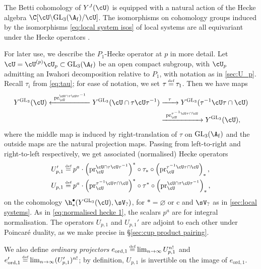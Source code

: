 \documentclass[10pt,reqno,a4paper]{amsart}
\newcommand{\subf}{_{\mathrm{f}}}
\newcommand{\GL}{\mathrm{GL}}
\begin{document}
The Betti cohomology of $Y^J(\cU)$ is equipped with a natural action of the Hecke algebra $\C[\cU \backslash \GL_3(\A\subf) / \cU]$. The isomorphisms on cohomology groups induced by the isomorphisms \eqref{eq:local system isos} of local systems are all equivariant under the Hecke operators \cite[\S1.2]{Urb11}.




\label{sec:hecke}

For later use, we describe the $P_1$-Hecke operator at $p$ in more detail. Let $\cU = \cU^{(p)}\cU_p \subset \GL_3(\A\subf)$ be an open compact subgroup, with $\cU_p$ admitting an Iwahori decomposition relative to $P_1$, with notation as in \cref{sec:U_p}.  Recall $\tau_i$ from \eqref{eq:tau}; for ease of notation, we set $\tau \defeq \tau_1$. Then we have maps
\begin{align*}
Y^{\GL_3}(\cU)\xleftarrow{\ \mathrm{pr}_{\cU}^{\cU \cap \tau \cU\tau^{-1}}\ }	Y^{\GL_3}(\cU \cap \tau \cU\tau^{-1})
&\xrightarrow{\ \ \tau\ \ }
Y^{\GL_3}(\tau^{-1} \cU \tau \cap \cU)\\
&\xrightarrow{\ \mathrm{pr}_{\cU}^{\tau^{-1} \cU \tau \cap \cU}\ } Y^{\GL_3}(\cU),
\end{align*}
where the middle map is induced by right-translation of $\tau$ on $\GL_3(\A\subf)$ and the outside maps are the natural projection maps. Passing from left-to-right and right-to-left respectively, we get associated (normalised) Hecke operators
\begin{align*}
U_{p,1}' &\defeq p^a \cdot \left(\mathrm{pr}_{\cU}^{\cU \cap \tau \cU\tau^{-1}}\right)^* \circ \tau_* \circ \left(\mathrm{pr}_{\cU}^{\tau^{-1} \cU \tau \cap \cU}\right)_*,\\
U_{p,1} &\defeq p^a \cdot \left(\mathrm{pr}_{\cU}^{\tau^{-1} \cU \tau \cap \cU}\right)^* \circ \tau^* \circ \left(\mathrm{pr}_{\cU}^{\cU \cap \tau \cU\tau^{-1}}\right)_*,
\end{align*}
on the cohomology $\h^\bullet_*(Y^{\GL_3}(\cU),\sV_?)$, for $* = \varnothing$ or $\mathrm{c}$ and $\sV_?$ as in \cref{sec:local systems}. As in \eqref{eq:normalised hecke 1}, the scalars $p^a$ are for integral normalisation. The operators $U_{p,1}$ and $U_{p,1}'$ are adjoint to each other under Poincar\'e duality, as we make precise in \S\ref{sec:cup product pairing}.

We also define \emph{ordinary projectors} $e_{\mathrm{ord},1} \defeq \lim_{n\to \infty} U_{p,1}^{n!}$ and $e_{\mathrm{ord},1}' \defeq \lim_{n \to \infty}(U_{p,1}')^{n!}$; by definition, $U_{p,1}$ is invertible on the image of $e_{\mathrm{ord},1}$.
\end{document}
